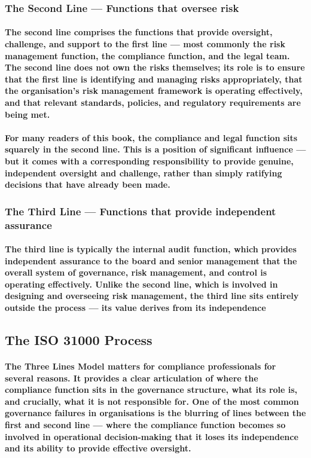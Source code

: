 \subsubsection{The Second Line — Functions that oversee risk}
\paragraph{The second line comprises the functions that provide oversight, challenge, and support to the first line — most commonly the risk management function, the compliance function, and the legal team. The second line does not own the risks themselves; its role is to ensure that the first line is identifying and managing risks appropriately, that the organisation's risk management framework is operating effectively, and that relevant standards, policies, and regulatory requirements are being met.}
\paragraph{For many readers of this book, the compliance and legal function sits squarely in the second line. This is a position of significant influence — but it comes with a corresponding responsibility to provide genuine, independent oversight and challenge, rather than simply ratifying decisions that have already been made.}
\subsubsection{The Third Line — Functions that provide independent assurance}
\paragraph{The third line is typically the internal audit function, which provides independent assurance to the board and senior management that the overall system of governance, risk management, and control is operating effectively. Unlike the second line, which is involved in designing and overseeing risk management, the third line sits entirely outside the process — its value derives from its independence}
\subsection{The ISO 31000 Process}
\paragraph{The Three Lines Model matters for compliance professionals for several reasons. It provides a clear articulation of where the compliance function sits in the governance structure, what its role is, and crucially, what it is not responsible for. One of the most common governance failures in organisations is the blurring of lines between the first and second line — where the compliance function becomes so involved in operational decision-making that it loses its independence and its ability to provide effective oversight.}
